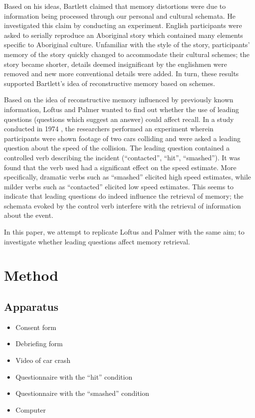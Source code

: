 \documentclass[a4paper,twocolumn]{report}
\begin{document}
Based on his ideas, Bartlett claimed that memory distortions were due to
information being processed through our personal and cultural schemata. He
investigated this claim by conducting an experiment. English participants
were asked to serially reproduce an Aboriginal story which contained many
elements specific to Aboriginal culture. Unfamiliar with the style of the
story, participants’ memory of the story quickly changed to accommodate
their cultural schemes; the story became shorter, details deemed
insignificant by the englishmen were removed and new more conventional
details were added. In turn, these results supported Bartlett’s idea of
reconstructive memory based on schemes.

Based on the idea of reconstructive memory influenced by previously known
information, Loftus and Palmer wanted to find out whether the use of leading
questions (questions which suggest an answer) could affect recall. In a
study conducted in 1974 \cite{lap}, the researchers performed an experiment wherein
participants were shown footage of two cars colliding and were asked a
leading question about the speed of the collision. The leading question contained a
controlled verb describing the incident (“contacted”, “hit”, “smashed”). It
was found that the verb used had a significant effect on the speed estimate.
More specifically, dramatic verbs such as “smashed” elicited high speed
estimates, while milder verbs such as “contacted” elicited low speed
estimates. This seems to indicate that leading questions do indeed influence
the retrieval of memory; the schemata evoked by the control verb interfere
with the retrieval of information about the event.

In this paper, we attempt to replicate Loftus and Palmer with the same aim;
to investigate whether leading questions affect memory retrieval.

\section{Method}

\subsection{Apparatus}

\begin{itemize}
\item Consent form
\item Debriefing form
\item Video of car crash
\item Questionnaire with the “hit” condition
\item Questionnaire with the “smashed” condition
\item Computer
\end{itemize}
\end{document}
